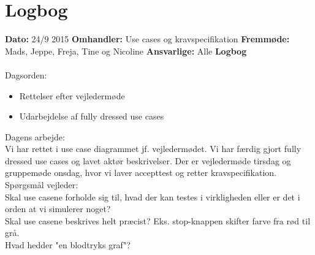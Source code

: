 \chapter{Logbog}

\textbf{Dato:} 24/9 2015 
\textbf{Omhandler:} Use cases og kravspecifikation
\textbf{Fremmøde:} Mads, Jeppe, Freja, Tine og Nicoline
\textbf{Ansvarlige:} Alle
\textbf{Logbog}
\\
\\
Dagsorden:
\begin{itemize}
	\item Rettelser efter vejledermøde
	\item Udarbejdelse af fully dressed use cases
\end{itemize}

Dagens arbejde: \\
Vi har rettet i use case diagrammet jf. vejledermødet. 
Vi har færdig gjort fully dressed use cases og lavet aktør beskrivelser.
Der er vejledermøde tirsdag og gruppemøde onsdag, hvor vi laver accepttest og retter kravspecifikation.\\


Spørgsmål vejleder: \\
Skal use casene forholde sig til, hvad der kan testes i virkligheden eller er det i orden at vi simulerer noget?\\
Skal use casene beskrives helt præcist? Eks. stop-knappen skifter farve fra rød til grå.\\
Hvad hedder "en blodtryks graf"?\\
